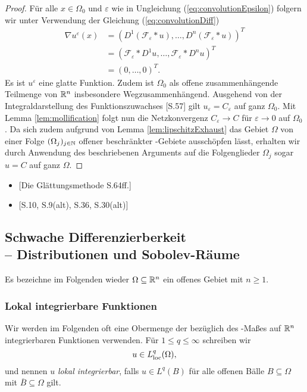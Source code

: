 \begin{proof}
  Für alle $x \in \Omega_0$ und $\varepsilon$ wie in Ungleichung (\ref{eq:convolutionEpsilon}) folgern wir unter Verwendung der Gleichung (\ref{eq:convolutionDiff})
  \begin{align*}
    \nabla u^\varepsilon(x)
    &= (D^1 (\mathcal{F}_\varepsilon \ast u), \dots, D^n (\mathcal{F}_\varepsilon \ast u))^T \\
    &= ( \mathcal{F}_\varepsilon \ast D^1 u, \dots, \mathcal{F}_\varepsilon \ast D^n u)^T \\
    &= (0, \dots, 0)^T.
  \end{align*}
  Es ist $u^\varepsilon$ eine glatte Funktion.
  Zudem ist $\Omega_0$ als offene zusammenhängende Teilmenge von $\mathbb{R}^n$ insbesondere Wegzusammenhängend.
  Ausgehend von der Integraldarstellung des Funktionszuwachses \cite{koenigsberger2004ana2}[S.57] gilt $u_\varepsilon = C_\varepsilon$ auf ganz $\Omega_0$.
  Mit Lemma \ref{lem:mollification} folgt nun die Netzkonvergenz $C_\varepsilon \to C$ für $\varepsilon \to 0$ auf $\Omega_0$.
  Da sich zudem aufgrund von Lemma \ref{lem:lipschitzExhaust} das Gebiet $\Omega$ von einer Folge $(\Omega_j)_{j \in \mathbb{N}}$ offener beschränkter \lipschitz\hyp{}Gebiete ausschöpfen lässt, erhalten wir durch Anwendung des beschriebenen Arguments auf die Folgenglieder $\Omega_j$ sogar $u = C$ auf ganz $\Omega$.
\end{proof}

\begin{itemize}
  \item \cite{sohr2001navier}[Die Glättungsmethode S.64ff.]
  \item \cite{adams2003sobolev}[S.10, S.9(alt), S.36, S.30(alt)]
\end{itemize}

\subsection{Schwache Differenzierberkeit \\-- Distributionen und Sobolev-Räume}
\label{subsec:distributionsSobolev}

Es bezeichne im Folgenden wieder $\Omega \subseteq \mathbb{R}^n$ ein offenes Gebiet mit $n \geq 1$.

\subsubsection{Lokal integrierbare Funktionen}

Wir werden im Folgenden oft eine Obermenge der bezüglich des \lebesgue\hyp{}Maßes auf $\mathbb{R}^n$ integrierbaren Funktionen verwenden.
Für $1 \leq q \leq \infty$ schreiben wir
$$
  u \in L^q_{\operatorname{loc}}(\Omega),
$$
und nennen $u$ \emph{lokal integrierbar}, falls $u \in L^q(B)$ für alle offenen Bälle $B \subseteq \Omega$ mit $\overline B \subseteq \Omega$ gilt.

